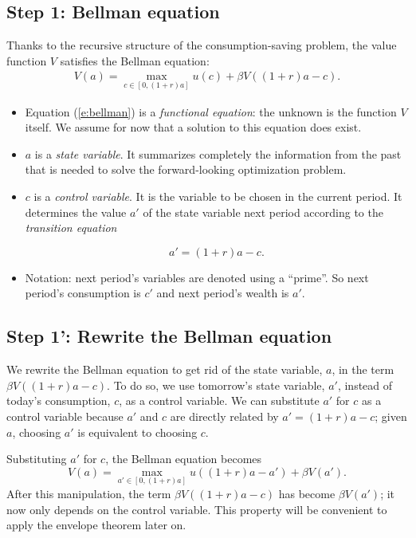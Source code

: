 \documentclass{article}
\begin{document}
\subsection{Step 1: Bellman equation}

Thanks to the recursive structure of the consumption-saving problem, the value function $V$ satisfies the Bellman equation:
\wcSpan*[id=equation-8]{}
\setcounter{tpequation}{7}\label{e:bellman}
\[
\begin{align*}
V(a)=\max_{c\in[0,(1+r) a]}u(c)+\beta V((1+r) a-c).\tag{8}
\end{align*}
\]

\begin{itemize}
\item Equation (\ref{e:bellman}) is a \textit{functional equation}: the unknown is the function $V$ itself. We assume for now that a solution to this equation does exist.
\item $a$ is a \textit{state variable}. It summarizes completely the information from the past that is needed to solve the forward-looking optimization problem.
\item $c$ is a \textit{control variable}. It is the variable to be chosen in the current period. It determines the value $a'$ of the state variable next period according to the \textit{transition equation}

\[
a'=(1+r) a-c.
\]
\item Notation: next period's variables are denoted using a ``prime''. So next period's consumption is $c'$ and next period's wealth is $a'$.
\end{itemize}

\subsection{Step 1': Rewrite the Bellman equation}

We rewrite the Bellman equation to get rid of the state variable, $a$, in the term $\beta V((1+r) a-c)$. To do so, we use tomorrow's state variable, $a'$, instead of today's consumption, $c$, as a control variable. We can substitute $a'$ for $c$ as a control variable because $a'$ and $c$ are directly related by $a'=(1+r) a-c$; given $a$, choosing $a'$ is equivalent to choosing $c$. 

Substituting $a'$ for $c$, the Bellman equation becomes
\wcSpan*[id=equation-9]{}
\setcounter{tpequation}{8}\label{e:recursive}
\[
V(a)=\max_{a'\in[0,(1+r) a]} u((1+r) a-a')+\beta V(a').\tag{9}
\]
After this manipulation, the term $\beta V((1+r) a-c)$ has become $\beta V(a')$; it now only depends on the control variable. This property will be convenient to apply the envelope theorem later on.
\end{document}
